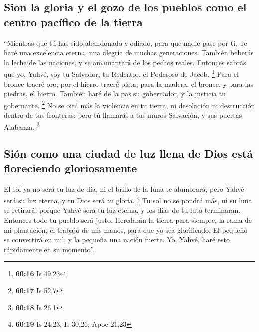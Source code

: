 \begin{paracol}{2}
\hypertarget{sion-la-gloria-y-el-gozo-de-los-pueblos-como-el-centro-pacuxedfico-de-la-tierra}{%
\subsection{Sion la gloria y el gozo de los pueblos como el centro
pacífico de la
tierra}\label{sion-la-gloria-y-el-gozo-de-los-pueblos-como-el-centro-pacuxedfico-de-la-tierra}}

 ``Mientras que tú has sido abandonado y odiado, para que
nadie pase por ti, Te haré una excelencia eterna, una alegría de muchas
generaciones.  También beberás la leche de las naciones,
y se amamantará de los pechos reales. Entonces sabrás que yo, Yahvé, soy
tu Salvador, tu Redentor, el Poderoso de Jacob. \footnote{\textbf{60:16}
  Is 49,23}  Para el bronce traeré oro; por el hierro
traeré plata; para la madera, el bronce, y para las piedras, el hierro.
También haré de la paz su gobernador, y la justicia tu gobernante.
\footnote{\textbf{60:17} Is 52,7}  No se oirá más la
violencia en tu tierra, ni desolación ni destrucción dentro de tus
fronteras; pero tú llamarás a tus muros Salvación, y sus puertas
Alabanza. \footnote{\textbf{60:18} Is 26,1}

\hypertarget{siuxf3n-como-una-ciudad-de-luz-llena-de-dios-estuxe1-floreciendo-gloriosamente}{%
\subsection{Sión como una ciudad de luz llena de Dios está floreciendo
gloriosamente}\label{siuxf3n-como-una-ciudad-de-luz-llena-de-dios-estuxe1-floreciendo-gloriosamente}}

 El sol ya no será tu luz de día, ni el brillo de la luna
te alumbrará, pero Yahvé será su luz eterna, y tu Dios será tu gloria.
\footnote{\textbf{60:19} Is 24,23; Is 30,26; Apoc 21,23} 
Tu sol no se pondrá más, ni su luna se retirará; porque Yahvé será tu
luz eterna, y los días de tu luto terminarán.  Entonces
todo tu pueblo será justo. Heredarán la tierra para siempre, la rama de
mi plantación, el trabajo de mis manos, para que yo sea glorificado.
 El pequeño se convertirá en mil, y la pequeña una nación
fuerte. Yo, Yahvé, haré esto rápidamente en su momento''.

\switchcolumn
\begin{otherlanguage}{english}

\hypertarget{zion-eclipsed-by-the-light-of-god}{%
}
\end{otherlanguage}
\end{paracol}
